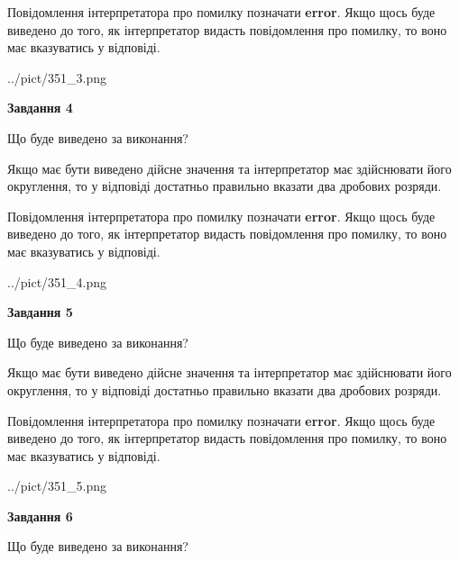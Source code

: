 \documentclass[12pt, ukrainian]{article}
\begin{document}
{\begin {Large}
Повідомлення інтерпретатора про помилку позначати \textbf{error}.
Якщо щось буде виведено до того, як інтерпретатор видасть повідомлення про помилку, 
то воно має вказуватись у відповіді. \par

\begin{center}
	{../pict/351_3.png}
\end{center}
\newpage

{\begin {center}\textbf{Завдання 4}\end {center}}\par
Що буде виведено за виконання? \par

Якщо має бути виведено дійсне значення та інтерпретатор має здійснювати його округлення, 
то у відповіді достатньо правильно вказати два дробових розряди.

Повідомлення інтерпретатора про помилку позначати \textbf{error}.
Якщо щось буде виведено до того, як інтерпретатор видасть повідомлення про помилку, 
то воно має вказуватись у відповіді. \par

\begin{center}
	{../pict/351_4.png}
\end{center}
\newpage

{\begin {center}\textbf{Завдання 5}\end {center}}\par
Що буде виведено за виконання? \par

Якщо має бути виведено дійсне значення та інтерпретатор має здійснювати його округлення, 
то у відповіді достатньо правильно вказати два дробових розряди.

Повідомлення інтерпретатора про помилку позначати \textbf{error}.
Якщо щось буде виведено до того, як інтерпретатор видасть повідомлення про помилку, 
то воно має вказуватись у відповіді. \par

\begin{center}
	{../pict/351_5.png}
\end{center}
\newpage

{\begin {center}\textbf{Завдання 6}\end {center}}\par
Що буде виведено за виконання? \par


\end{Large}}
\end{document}
